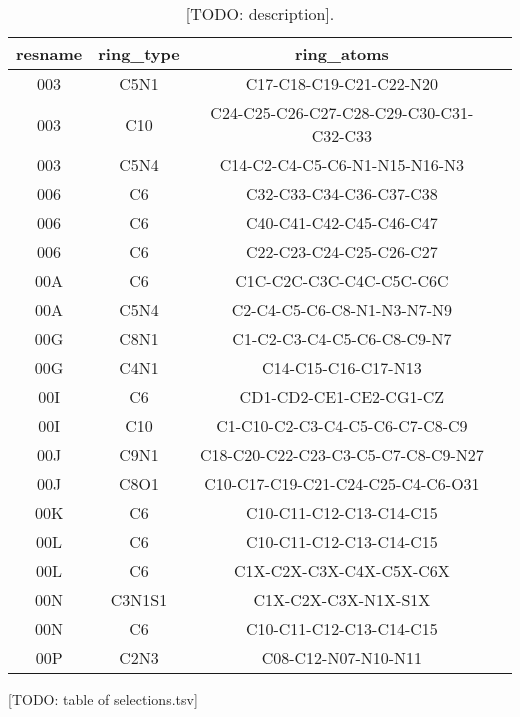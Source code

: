 \begin{table}[H]
  \caption{\label{tab:methods/aromatic_ligand} [TODO: description].}
  \centering
  \begin{tabular}{cccc}
    \hline
    resname & ring\_type & ring\_atoms                             &  \\ \hline
    003     & C5N1       & C17-C18-C19-C21-C22-N20                 &  \\
    003     & C10        & C24-C25-C26-C27-C28-C29-C30-C31-C32-C33 &  \\
    003     & C5N4       & C14-C2-C4-C5-C6-N1-N15-N16-N3           &  \\
    006     & C6         & C32-C33-C34-C36-C37-C38                 &  \\
    006     & C6         & C40-C41-C42-C45-C46-C47                 &  \\
    006     & C6         & C22-C23-C24-C25-C26-C27                 &  \\
    00A     & C6         & C1C-C2C-C3C-C4C-C5C-C6C                 &  \\
    00A     & C5N4       & C2-C4-C5-C6-C8-N1-N3-N7-N9              &  \\
    00G     & C8N1       & C1-C2-C3-C4-C5-C6-C8-C9-N7              &  \\
    00G     & C4N1       & C14-C15-C16-C17-N13                     &  \\
    00I     & C6         & CD1-CD2-CE1-CE2-CG1-CZ                  &  \\
    00I     & C10        & C1-C10-C2-C3-C4-C5-C6-C7-C8-C9          &  \\
    00J     & C9N1       & C18-C20-C22-C23-C3-C5-C7-C8-C9-N27      &  \\
    00J     & C8O1       & C10-C17-C19-C21-C24-C25-C4-C6-O31       &  \\
    00K     & C6         & C10-C11-C12-C13-C14-C15                 &  \\
    00L     & C6         & C10-C11-C12-C13-C14-C15                 &  \\
    00L     & C6         & C1X-C2X-C3X-C4X-C5X-C6X                 &  \\
    00N     & C3N1S1     & C1X-C2X-C3X-N1X-S1X                     &  \\
    00N     & C6         & C10-C11-C12-C13-C14-C15                 &  \\
    00P     & C2N3       & C08-C12-N07-N10-N11                     &  \\ \hline
  \end{tabular}
\end{table}

[TODO: table of selections.tsv]
